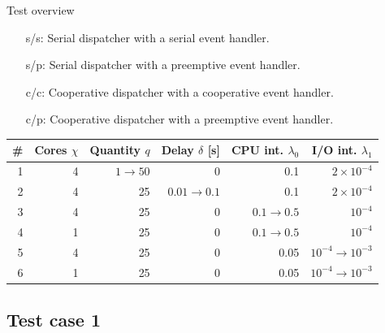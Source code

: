 \documentclass{beamer}
\begin{document}
    \begin{frame}{Test overview}

        \begin{itemize}
            \item[s/s:] Serial dispatcher with a serial event handler.
            \item[s/p:] Serial dispatcher with a preemptive event handler.
            \item[c/c:] Cooperative dispatcher with a cooperative event
                handler.
            \item[c/p:] Cooperative dispatcher with a preemptive event handler.
        \end{itemize}

        \bgroup
        \def\arraystretch{1.2}
        \begin{table}[h!]
        \begin{center}
        \resizebox{\columnwidth}{!} {
        \begin{tabular}{|r|r|r|r|r|r|}
            \hline
            \# & Cores $\chi$ & Quantity $q$ & Delay $\delta$ [s] & CPU int. $\lambda_0$ & I/O int. $\lambda_1$ \\
            \hline
            1 & 4 & $1 \rightarrow 50$ & 0 & 0.1 & $2 \times 10^{-4}$ \\
            \hline
            2 & 4 & 25 & $0.01 \rightarrow 0.1$ & 0.1 & $2 \times 10^{-4}$ \\
            \hline
            3 & 4 & 25 & 0 & $0.1 \rightarrow 0.5$ & $10^{-4}$ \\
            \hline
            4 & 1 & 25 & 0 & $0.1 \rightarrow 0.5$ & $10^{-4}$ \\
            \hline
            5 & 4 & 25 & 0 & 0.05 & $10^{-4} \rightarrow 10^{-3}$ \\
            \hline
            6 & 1 & 25 & 0 & 0.05 & $10^{-4} \rightarrow 10^{-3}$ \\
            \hline
        \end{tabular}
        }
        \end{center}
        \end{table}

    \end{frame}

    \subsection{Test case 1}

%
%
\end{document}
